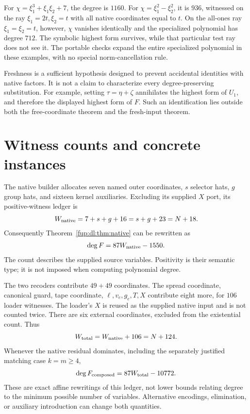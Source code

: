 \documentclass[11pt,letterpaper]{article}
\theoremstyle{definition}\newtheorem{definition}[theorem]{Definition}
\theoremstyle{remark}\newtheorem{remark}[theorem]{Remark}
\begin{document}
For $\chi=\xi_1^3+\xi_1\xi_2+7$, the degree is $1160$. For $\chi=\xi_1^2-\xi_2^2$, it is $936$, witnessed on the ray $\xi_1=2t,\xi_2=t$ with all native coordinates equal to $t$. On the all-ones ray $\xi_1=\xi_2=t$, however, $\chi$ vanishes identically and the specialized polynomial has degree $712$. The symbolic highest form survives, while that particular test ray does not see it. The portable checks expand the entire specialized polynomial in these examples, with no special norm-cancellation rule.

Freshness is a sufficient hypothesis designed to prevent accidental identities with native factors. It is not a claim to characterize every degree-preserving substitution. For example, setting $\tau=\eta+\zeta$ annihilates the highest form of $U_1$, and therefore the displayed highest form of $F$. Such an identification lies outside both the free-coordinate theorem and the fresh-input theorem.

\section{Witness counts and concrete instances}\label{fup:dl:sec:counts}
The native builder allocates seven named outer coordinates, $s$ selector hats, $g$ group hats, and sixteen kernel auxiliaries. Excluding its supplied $X$ port, its positive-witness ledger is
\[
 W_{\rm native}=7+s+g+16=s+g+23=N+18.
\]
Consequently Theorem~\ref{fup:dl:thm:native} can be rewritten as
\begin{equation}\label{fup:dl:eq:nativearity}
 \deg F=87W_{\rm native}-1550.
\end{equation}
The count describes the supplied source variables. Positivity is their semantic type; it is not imposed when computing polynomial degree.

The two recoders contribute $49+49$ coordinates. The spread coordinate, canonical guard, tape coordinate, $\ell,v_e,g_e,T,X$ contribute eight more, for $106$ loader witnesses. The loader's $X$ is reused as the supplied native input and is not counted twice. There are six external coordinates, excluded from the existential count. Thus
\[
 W_{\rm total}=W_{\rm native}+106=N+124.
\]
Whenever the native residual dominates, including the separately justified matching case $k=m\ge4$,
\begin{equation}\label{fup:dl:eq:totalarity}
 \deg F_{\rm composed}=87W_{\rm total}-10772.
\end{equation}
These are exact affine rewritings of this ledger, not lower bounds relating degree to the minimum possible number of variables. Alternative encodings, elimination, or auxiliary introduction can change both quantities.
\end{document}
